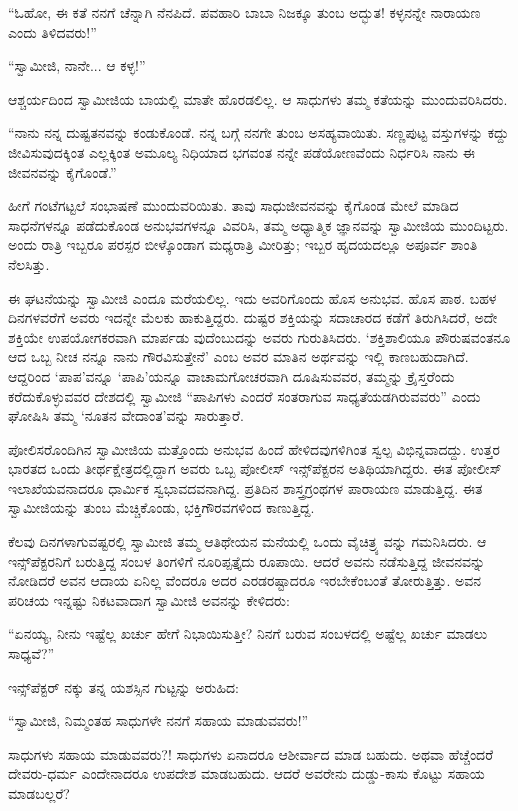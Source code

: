“ಓಹೋ, ಈ ಕತೆ ನನಗೆ ಚೆನ್ನಾಗಿ ನೆನಪಿದೆ. ಪವಹಾರಿ ಬಾಬಾ ನಿಜಕ್ಕೂ ತುಂಬ ಅದ್ಭುತ! ಕಳ್ಳನನ್ನೇ ನಾರಾಯಣ ಎಂದು ತಿಳಿದವರು!”

“ಸ್ವಾಮೀಜಿ, ನಾನೇ... ಆ ಕಳ್ಳ!”

ಆಶ್ಚರ್ಯದಿಂದ ಸ್ವಾಮೀಜಿಯ ಬಾಯಲ್ಲಿ ಮಾತೇ ಹೊರಡಲಿಲ್ಲ. ಆ ಸಾಧುಗಳು ತಮ್ಮ ಕತೆಯನ್ನು ಮುಂದುವರಿಸಿದರು.

“ನಾನು ನನ್ನ ದುಷ್ಟತನವನ್ನು ಕಂಡುಕೊಂಡೆ. ನನ್ನ ಬಗ್ಗೆ ನನಗೇ ತುಂಬ ಅಸಹ್ಯವಾಯಿತು. ಸಣ್ಣಪುಟ್ಟ ವಸ್ತುಗಳನ್ನು ಕದ್ದು ಜೀವಿಸುವುದಕ್ಕಿಂತ ಎಲ್ಲಕ್ಕಿಂತ ಅಮೂಲ್ಯ ನಿಧಿಯಾದ ಭಗವಂತ ನನ್ನೇ ಪಡೆಯೋಣವೆಂದು ನಿರ್ಧರಿಸಿ ನಾನು ಈ ಜೀವನವನ್ನು ಕೈಗೊಂಡೆ.”

ಹೀಗೆ ಗಂಟೆಗಟ್ಟಲೆ ಸಂಭಾಷಣೆ ಮುಂದುವರಿಯಿತು. ತಾವು ಸಾಧುಜೀವನವನ್ನು ಕೈಗೊಂಡ ಮೇಲೆ ಮಾಡಿದ ಸಾಧನೆಗಳನ್ನೂ ಪಡೆದುಕೊಂಡ ಅನುಭವಗಳನ್ನೂ ವಿವರಿಸಿ, ತಮ್ಮ ಅಧ್ಯಾತ್ಮಿಕ ಜ್ಞಾನವನ್ನು ಸ್ವಾಮೀಜಿಯ ಮುಂದಿಟ್ಟರು. ಅಂದು ರಾತ್ರಿ ಇಬ್ಬರೂ ಪರಸ್ಪರ ಬೀಳ್ಕೊಂಡಾಗ ಮಧ್ಯರಾತ್ರಿ ಮೀರಿತ್ತು; ಇಬ್ಬರ ಹೃದಯದಲ್ಲೂ ಅಪೂರ್ವ ಶಾಂತಿ ನೆಲಸಿತ್ತು.

ಈ ಘಟನೆಯನ್ನು ಸ್ವಾಮೀಜಿ ಎಂದೂ ಮರೆಯಲಿಲ್ಲ. ಇದು ಅವರಿಗೊಂದು ಹೊಸ ಅನುಭವ. ಹೊಸ ಪಾಠ. ಬಹಳ ದಿನಗಳವರೆಗೆ ಅವರು ಇದನ್ನೇ ಮೆಲಕು ಹಾಕುತ್ತಿದ್ದರು. ದುಷ್ಟರ ಶಕ್ತಿಯನ್ನು ಸದಾಚಾರದ ಕಡೆಗೆ ತಿರುಗಿಸಿದರೆ, ಅದೇ ಶಕ್ತಿಯೇ ಉಪಯೋಗಕರವಾಗಿ ಮಾರ್ಪಡು ವುದೆಂಬುದನ್ನು ಅವರು ಗುರುತಿಸಿದರು. ‘ಶಕ್ತಿಶಾಲಿಯೂ ಪೌರುಷವಂತನೂ ಆದ ಒಬ್ಬ ನೀಚ ನನ್ನೂ ನಾನು ಗೌರವಿಸುತ್ತೇನೆ’ ಎಂಬ ಅವರ ಮಾತಿನ ಅರ್ಥವನ್ನು ಇಲ್ಲಿ ಕಾಣಬಹುದಾಗಿದೆ. ಆದ್ದರಿಂದ ‘ಪಾಪ’ವನ್ನೂ ‘ಪಾಪಿ’ಯನ್ನೂ ವಾಚಾಮಗೋಚರವಾಗಿ ದೂಷಿಸುವವರ, ತಮ್ಮನ್ನು ಕ್ರೈಸ್ತರೆಂದು ಕರೆದುಕೊಳ್ಳುವವರ ದೇಶದಲ್ಲಿ ಸ್ವಾಮೀಜಿ “ಪಾಪಿಗಳು ಎಂದರೆ ಸಂತರಾಗುವ ಸಾಧ್ಯತೆಯಡಗಿರುವವರು” ಎಂದು ಘೋಷಿಸಿ ತಮ್ಮ ‘ನೂತನ ವೇದಾಂತ’ವನ್ನು ಸಾರುತ್ತಾರೆ.

ಪೋಲಿಸರೊಂದಿಗಿನ ಸ್ವಾಮೀಜಿಯ ಮತ್ತೊಂದು ಅನುಭವ ಹಿಂದೆ ಹೇಳಿದವುಗಳಿಗಿಂತ ಸ್ವಲ್ಪ ವಿಭಿನ್ನವಾದದ್ದು. ಉತ್ತರ ಭಾರತದ ಒಂದು ತೀರ್ಥಕ್ಷೇತ್ರದಲ್ಲಿದ್ದಾಗ ಅವರು ಒಬ್ಬ ಪೋಲೀಸ್ ಇನ್ಸ್​ಪೆಕ್ಟರನ ಅತಿಥಿಯಾಗಿದ್ದರು. ಈತ ಪೋಲೀಸ್ ಇಲಾಖೆಯವನಾದರೂ ಧಾರ್ಮಿಕ ಸ್ವಭಾವದವನಾಗಿದ್ದ. ಪ್ರತಿದಿನ ಶಾಸ್ತ್ರಗ್ರಂಥಗಳ ಪಾರಾಯಣ ಮಾಡುತ್ತಿದ್ದ. ಈತ ಸ್ವಾಮೀಜಿಯನ್ನು ತುಂಬ ಮೆಚ್ಚಿಕೊಂಡು, ಭಕ್ತಿಗೌರವಗಳಿಂದ ಕಾಣುತ್ತಿದ್ದ.

ಕೆಲವು ದಿನಗಳಾಗುವಷ್ಟರಲ್ಲಿ ಸ್ವಾಮೀಜಿ ತಮ್ಮ ಆತಿಥೇಯನ ಮನೆಯಲ್ಲಿ ಒಂದು ವೈಚಿತ್ರ್ಯ ವನ್ನು ಗಮನಿಸಿದರು. ಆ ಇನ್ಸ್​ಪೆಕ್ಟರನಿಗೆ ಬರುತ್ತಿದ್ದ ಸಂಬಳ ತಿಂಗಳಿಗೆ ನೂರಿಪ್ಪತ್ತೈದು ರೂಪಾಯಿ. ಆದರೆ ಅವನು ನಡೆಸುತ್ತಿದ್ದ ಜೀವನವನ್ನು ನೋಡಿದರೆ ಅವನ ಆದಾಯ ಏನಿಲ್ಲ ವೆಂದರೂ ಅದರ ಎರಡರಷ್ಟಾದರೂ ಇರಬೇಕೆಂಬಂತೆ ತೋರುತ್ತಿತ್ತು. ಅವನ ಪರಿಚಯ ಇನ್ನಷ್ಟು ನಿಕಟವಾದಾಗ ಸ್ವಾಮೀಜಿ ಅವನನ್ನು ಕೇಳಿದರು:

“ಏನಯ್ಯ, ನೀನು ಇಷ್ಟೆಲ್ಲ ಖರ್ಚು ಹೇಗೆ ನಿಭಾಯಿಸುತ್ತೀ? ನಿನಗೆ ಬರುವ ಸಂಬಳದಲ್ಲಿ ಅಷ್ಟೆಲ್ಲ ಖರ್ಚು ಮಾಡಲು ಸಾಧ್ಯವೆ?”

ಇನ್ಸ್​ಪೆಕ್ಟರ್ ನಕ್ಕು ತನ್ನ ಯಶಸ್ಸಿನ ಗುಟ್ಟನ್ನು ಅರುಹಿದ:

“ಸ್ವಾಮೀಜಿ, ನಿಮ್ಮಂತಹ ಸಾಧುಗಳೇ ನನಗೆ ಸಹಾಯ ಮಾಡುವವರು!”

ಸಾಧುಗಳು ಸಹಾಯ ಮಾಡುವವರು?! ಸಾಧುಗಳು ಏನಾದರೂ ಆಶೀರ್ವಾದ ಮಾಡ ಬಹುದು. ಅಥವಾ ಹೆಚ್ಚೆಂದರೆ ದೇವರು-ಧರ್ಮ ಎಂದೇನಾದರೂ ಉಪದೇಶ ಮಾಡಬಹುದು. ಆದರೆ ಅವರೇನು ದುಡ್ಡು-ಕಾಸು ಕೊಟ್ಟು ಸಹಾಯ ಮಾಡಬಲ್ಲರೆ?

